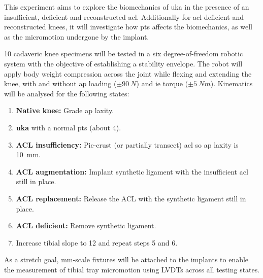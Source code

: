 This experiment aims to explore the biomechanics of \gls{uka} in the presence of an insufficient, deficient and reconstructed \gls{acl}.
Additionally for \gls{acl} deficient and reconstructed knees, it will investigate how \gls{pts} affects the biomechanics, as well as the micromotion undergone by the implant.

10 cadaveric knee specimens will be tested in a six degree-of-freedom robotic system with the objective of establishing a stability envelope.
The robot will apply body weight compression across the joint while flexing and extending the knee, with and without \gls{ap} loading ($\pm \SI{90}{N}$) and \gls{ie} torque ($\pm \SI{5}{Nm}$).
Kinematics will be analysed for the following states:
\begin{enumerate}
    \item \textbf{Native knee:} Grade \gls{ap} laxity.
    \item \textbf{\gls{uka}} with a normal \gls{pts} (about 4\degree{}).
    \item \textbf{ACL insufficiency:} Pie-crust (or partially transect) \gls{acl} so \gls{ap} laxity is \SI{10}{mm}.
\item \textbf{ACL augmentation:} Implant synthetic ligament with the insufficient \gls{acl} still in place.
    \item \textbf{ACL replacement:} Release the ACL with the synthetic ligament still in place.
    \item \textbf{ACL deficient:} Remove synthetic ligament.
    \item Increase tibial slope to 12\degree{} and repeat steps 5 and 6.
\end{enumerate}

As a stretch goal, mm-scale fixtures will be attached to the implants to enable the measurement of tibial tray micromotion using LVDTs across all testing states.
